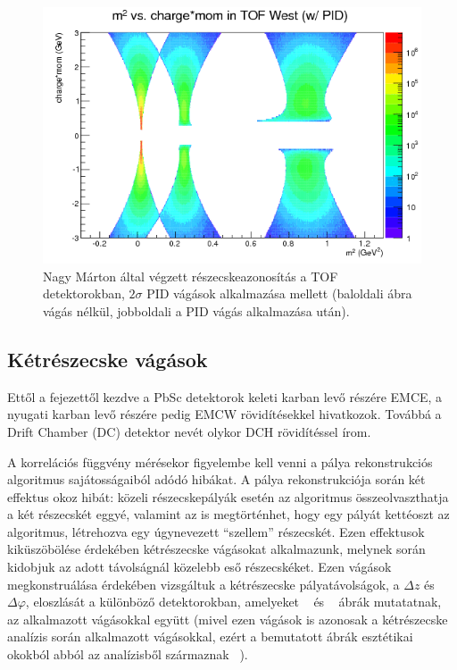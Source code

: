 \documentclass[11pt,a4paper]{article}
\numberwithin{equation}{subsection}
\numberwithin{figure}{section}
\begin{document}
\begin{figure}[H]
\includegraphics[scale=0.39]{pic/dat/nm/h_m2sum_tofw_pid.png}
\caption{Nagy Márton által végzett részecskeazonosítás a TOF detektorokban, $2\sigma$ PID vágások alkalmazása mellett (baloldali ábra vágás nélkül, jobboldali a PID vágás alkalmazása után).}
\label{fig:m2sum2}
\end{figure}


\subsection{Kétrészecske vágások}

Ettől a fejezettől kezdve a PbSc detektorok keleti karban levő részére EMCE, a nyugati karban levő részére pedig EMCW rövidítésekkel hivatkozok. Továbbá a Drift Chamber (DC) detektor nevét olykor DCH rövidítéssel írom.

A korrelációs függvény mérésekor figyelembe kell venni a pálya rekonstrukciós algoritmus sajátosságaiból adódó hibákat. A pálya rekonstrukciója során két effektus okoz hibát: közeli részecskepályák esetén az algoritmus összeolvaszthatja a két részecskét eggyé, valamint az is megtörténhet, hogy egy pályát kettéoszt az algoritmus, létrehozva egy úgynevezett ``szellem'' részecskét. Ezen effektusok kiküszöbölése érdekében kétrészecske vágásokat alkalmazunk, melynek során kidobjuk az adott távolságnál közelebb eső részecskéket. Ezen vágások megkonstruálása érdekében vizsgáltuk a kétrészecske pályatávolságok, a $\Delta z$ és $\Delta\varphi$, eloszlását a különböző detektorokban, amelyeket ~ és ~ ábrák mutatatnak, az alkalmazott vágásokkal együtt (mivel ezen vágások is azonosak a kétrészecske analízis során alkalmazott vágásokkal, ezért a bemutatott ábrák esztétikai okokból abból az analízisből származnak ~\cite{AN1244}).
\end{document}
